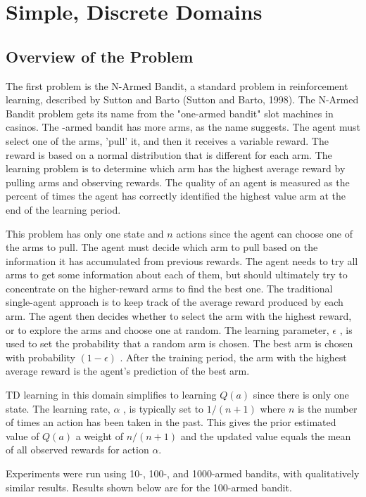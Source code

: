 \section{Simple, Discrete Domains}
\subsection{Overview of the Problem}
The first problem is the N-Armed Bandit, a standard problem in reinforcement learning, described by Sutton and Barto (Sutton and Barto, 1998). The N-Armed Bandit problem gets its name from the "one-armed bandit" slot machines in casinos.  The  -armed bandit has more arms, as the name suggests.  The agent must select one of the arms, 'pull' it, and then it receives a variable reward.  The reward is based on a normal distribution that is different for each arm.  The learning problem is to determine which arm has the highest average reward by pulling arms and observing rewards.  The quality of an agent is measured as the percent of times the agent has correctly identified the highest value arm at the end of the learning period.

This problem has only one state and $n$ actions since the agent can choose one of the   arms to pull.  The agent must decide which arm to pull based on the information it has accumulated from previous rewards.  The agent needs to try all arms to get some information about each of them, but should ultimately try to concentrate on the higher-reward arms to find the best one.  The traditional single-agent approach is to keep track of the average reward produced by each arm.  The agent then decides whether to select the arm with the highest reward, or to explore the arms and choose one at random.  The learning parameter, $\epsilon$ , is used to set the probability that a random arm is chosen.  The best arm is chosen with probability $(1-\epsilon)$ .  After the training period, the arm with the highest average reward is the agent’s prediction of the best arm.

TD learning in this domain simplifies to learning $Q(a)$  since there is only one state.  The learning rate, $\alpha$ , is typically set to $1/(n+1)$ where $n$ is the number of times an action has been taken in the past.  This gives the prior estimated value of $Q(a)$ a weight of $n/(n+1)$ and the updated value equals the mean of all observed rewards for action $\alpha$.

Experiments were run using 10-, 100-, and 1000-armed bandits, with qualitatively similar results.  Results shown below are for the 100-armed bandit.


